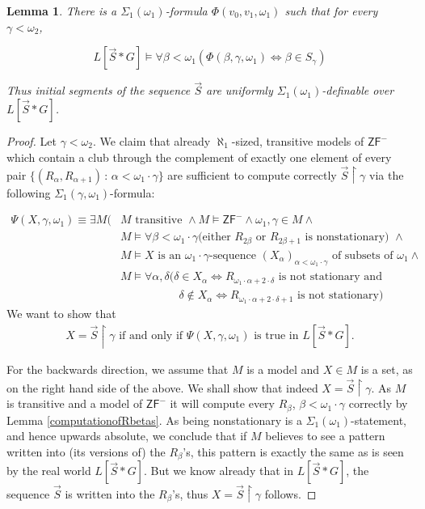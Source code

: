 \documentclass[a4paper,11pt]{article}
\newtheorem{lemma}[theorem]{Lemma}
\newcommand{\ZFP}{\mathsf{ZF}^-}
\begin{document}
\begin{lemma}\label{definabilityofvecS}
There is a $\Sigma_1(\omega_1)$-formula $\Phi(v_0,v_1,\omega_1)$ {such that for every} $\gamma < \omega_2$,

\[ L[\vec{S} \ast G] \models \forall \beta < \omega_1 (\Phi (\beta, \gamma,\omega_1) \Leftrightarrow \beta \in S_{\gamma}) \]
 
Thus initial segments  of the sequence $\vec{S} $ are uniformly  $\Sigma_1(\omega_1)$-definable over $L[\vec{S} \ast G]$.
\end{lemma}
\begin{proof}
Let $\gamma < \omega_2$.
We claim that already $\aleph_1$-sized, transitive models of $\ZFP$ which contain a club through the complement of exactly one element of every pair $\{(R_{\alpha}, R_{\alpha+1}) \, : \, \alpha < \omega_1 \cdot \gamma\}$ are sufficient to compute correctly $\vec{S} \upharpoonright \gamma$ via the following $\Sigma_1(\gamma, \omega_1)$-formula: 

\begin{align*}
\Psi(X,\gamma, \omega_1) \equiv  \exists M (&M \text{ transitive } \land M \models \ZFP \land \omega_1,\gamma \in M \land
\\& M \models \forall \beta< \omega_1 \cdot \gamma (\text{either  $R_{2\beta}$ or $R_{2\beta+1}$ is nonstationary) } \land \\& 
M \models X \text{ is an $\omega_1 \cdot \gamma$-sequence $(X_{\alpha})_{\alpha < \omega_1 \cdot \gamma}$ of subsets of $\omega_1$} \land\\&
M \models  \forall \alpha, \delta (\delta \in X_{\alpha} \Leftrightarrow R_{\omega_1 \cdot \alpha + 2 \cdot \delta} \text{ is not stationary and} \\& \qquad \qquad \quad \,
\delta \notin X_{\alpha} \Leftrightarrow  R_{\omega_1 \cdot \alpha + 2 \cdot \delta +1} \text{ is not stationary})
\end{align*}
We want to show that 
\begin{align*}
X=\vec{S} \upharpoonright \gamma \text{ if and only if } \Psi(X,\gamma,\omega_1) \text{ is true in }L[\vec{S} \ast G].
\end{align*}

For the backwards direction, we assume that $M$ is a model and $X \in M$ is a set, as on the right hand side of the above. We shall show that indeed $X=\vec{S}\upharpoonright \gamma$.  As $M$ is transitive and a model of $\ZFP$ it will compute every $R_{\beta}$, $\beta < \omega_1 \cdot \gamma$ correctly by Lemma \ref{computationofRbetas}. As being nonstationary is a $\Sigma_1(\omega_1)$-statement, and hence upwards absolute, we conclude that if $M$ believes to see a pattern written into (its versions of) the $R_{\beta}$'s, this pattern is exactly the same as is seen by the real world $L[\vec{S} \ast G]$. But we know already that in $L[\vec{S} \ast G]$, the sequence $\vec{S}$ is written into the $R_{\beta}$'s, thus $X=\vec{S} \upharpoonright \gamma$ follows.


\end{proof}
\end{document}
